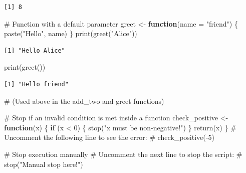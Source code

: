 \documentclass[
  letterpaper,
  DIV=11,
  numbers=noendperiod]{scrartcl}
\newenvironment{Shaded}{\begin{snugshade}}{\end{snugshade}}
\newcommand{\AttributeTok}[1]{\textcolor[rgb]{0.40,0.45,0.13}{#1}}
\newcommand{\CommentTok}[1]{\textcolor[rgb]{0.37,0.37,0.37}{#1}}
\newcommand{\ControlFlowTok}[1]{\textcolor[rgb]{0.00,0.23,0.31}{\textbf{#1}}}
\newcommand{\DecValTok}[1]{\textcolor[rgb]{0.68,0.00,0.00}{#1}}
\newcommand{\FunctionTok}[1]{\textcolor[rgb]{0.28,0.35,0.67}{#1}}
\newcommand{\NormalTok}[1]{\textcolor[rgb]{0.00,0.23,0.31}{#1}}
\newcommand{\OtherTok}[1]{\textcolor[rgb]{0.00,0.23,0.31}{#1}}
\newcommand{\SpecialCharTok}[1]{\textcolor[rgb]{0.37,0.37,0.37}{#1}}
\newcommand{\StringTok}[1]{\textcolor[rgb]{0.13,0.47,0.30}{#1}}
\begin{document}
\begin{verbatim}
[1] 8
\end{verbatim}

\begin{Shaded}
\begin{Highlighting}[]
\CommentTok{\#   Function with a default parameter}
\NormalTok{greet }\OtherTok{\textless{}{-}} \ControlFlowTok{function}\NormalTok{(}\AttributeTok{name =} \StringTok{"friend"}\NormalTok{) \{}
  \FunctionTok{paste}\NormalTok{(}\StringTok{"Hello"}\NormalTok{, name)}
\NormalTok{\}}
\FunctionTok{print}\NormalTok{(}\FunctionTok{greet}\NormalTok{(}\StringTok{"Alice"}\NormalTok{))}
\end{Highlighting}
\end{Shaded}

\begin{verbatim}
[1] "Hello Alice"
\end{verbatim}

\begin{Shaded}
\begin{Highlighting}[]
\FunctionTok{print}\NormalTok{(}\FunctionTok{greet}\NormalTok{())}
\end{Highlighting}
\end{Shaded}

\begin{verbatim}
[1] "Hello friend"
\end{verbatim}

\begin{Shaded}
\begin{Highlighting}[]
\CommentTok{\# (Used above in the add\_two and greet functions)}
\end{Highlighting}
\end{Shaded}

\begin{Shaded}
\begin{Highlighting}[]
\CommentTok{\#   Stop if an invalid condition is met inside a function}
\NormalTok{check\_positive }\OtherTok{\textless{}{-}} \ControlFlowTok{function}\NormalTok{(x) \{}
  \ControlFlowTok{if}\NormalTok{ (x }\SpecialCharTok{\textless{}} \DecValTok{0}\NormalTok{) \{}
    \FunctionTok{stop}\NormalTok{(}\StringTok{"x must be non{-}negative!"}\NormalTok{)}
\NormalTok{  \}}
  \FunctionTok{return}\NormalTok{(x)}
\NormalTok{\}}
\CommentTok{\# Uncomment the following line to see the error:}
\CommentTok{\# check\_positive({-}5)}

\CommentTok{\#   Stop execution manually}
\CommentTok{\# Uncomment the next line to stop the script:}
\CommentTok{\# stop("Manual stop here!")}
\end{Highlighting}
\end{Shaded}
\end{document}
